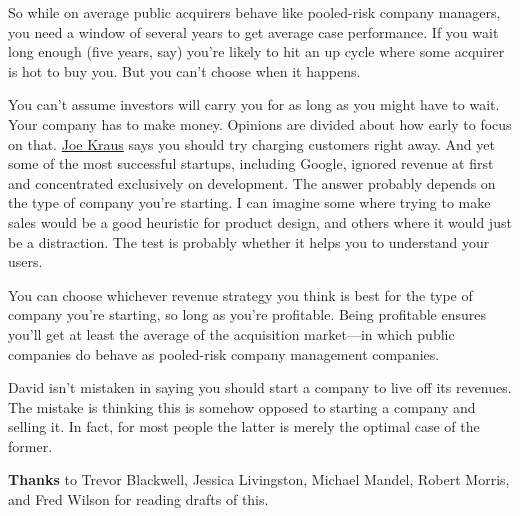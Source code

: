 So
                  while on average public acquirers behave like pooled-risk
                  company managers, you need a window of several years to get
                  average case performance. If you wait long enough (five years,
                  say) you're likely to hit an up cycle where some acquirer is
                  hot to buy you. But you can't choose when it happens.

You
                  can't assume investors will carry you for as long as you might
                  have to wait. Your company has to make money. Opinions are
                  divided about how early to focus on that.
                  \href{http://susanitsa.wordpress.com/2006/11/08/the-joe-kraus-qa-better-late/}{Joe Kraus}
                  says you should try charging customers right away. And yet
                  some of the most successful startups, including Google,
                  ignored revenue at first and concentrated exclusively on
                  development. The answer probably depends on the type of
                  company you're starting. I can imagine some where trying to
                  make sales would be a good heuristic for product design, and
                  others where it would just be a distraction. The test is
                  probably whether it helps you to understand your users.

You
                  can choose whichever revenue strategy you think is best for
                  the type of company you're starting, so long as you're
                  profitable. Being profitable ensures you'll get at least the
                  average of the acquisition market---in which public
                  companies do behave as pooled-risk company management
                  companies.

David isn't mistaken in saying you
                  should start a company to live off its revenues. The mistake
                  is thinking this is somehow opposed to starting a company and
                  selling it. In fact, for most people the latter is merely the
                  optimal case of the former.





\textbf{Thanks}
                  to Trevor Blackwell, Jessica Livingston, Michael Mandel,
                  Robert Morris, and Fred Wilson for reading drafts of this.


                  


              
            
          
